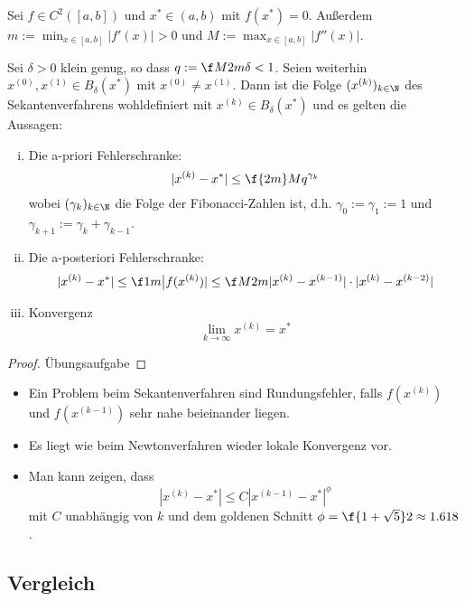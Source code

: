 \documentclass[11pt]{scrbook}
\begin{document}
\begin{st} \label{3.6}
	Sei $f\in C^2([a,b])$ und $x^* \in (a,b)$ mit $f(x^*) = 0$.
	Außerdem $m := \min_{x \in [a,b]}|f'(x)| > 0$ und $M := \max_{x\in[a,b]}|f''(x)|$.

	Sei $\delta > 0$ klein genug, so dass $q := \f M{2m} \delta < 1$.
	Seien weiterhin $x^{(0)}, x^{(1)} \in B_\delta(x^*)$ mit $x^{(0)} \neq x^{(1)}$.
	Dann ist die Folge $(x^{(k)})_{k \in \N}$ des Sekantenverfahrens wohldefiniert mit $x^{(k)} \in B_\delta(x^*)$ und es gelten die Aussagen:
	\begin{enumerate}[i)]
		\item
			Die a-priori Fehlerschranke:
			\[
				|x^{(k)} -x^*| \le \f {2m}M q^{\gamma_k}
			\]
			wobei $(\gamma_k)_{k\in \N}$ die Folge der Fibonacci-Zahlen ist, d.h. $\gamma_0 := \gamma_1 := 1$ und $\gamma_{k+1} := \gamma_k + \gamma_{k-1}$.
		\item
			Die a-posteriori Fehlerschranke:
			\[
				|x^{(k)}-x^*| \le \f 1m \big| f(x^{(k)}) | \le \f M{2m} |x^{(k)} - x^{(k-1)}| \cdot |x^{(k)}-x^{(k-2)}|
			\]
		\item
			Konvergenz
			\[
				\lim_{k \to \infty} x^{(k)} = x^*
			\]
	\end{enumerate}
	\begin{proof}
		Übungsaufgabe
	\end{proof}
	\begin{note}
		\begin{itemize}
			\item
				Ein Problem beim Sekantenverfahren sind Rundungsfehler, falls $f(x^{(k)})$ und $f(x^{(k-1)})$ sehr nahe beieinander liegen.
			\item
				Es liegt wie beim Newtonverfahren wieder lokale Konvergenz vor.
			\item
				Man kann zeigen, dass
				\[
					|x^{(k)} - x^*| \le C |x^{(k-1)} - x^*|^\phi
				\]
				mit $C$ unabhängig von $k$ und dem goldenen Schnitt $\phi = \f {1+\sqrt 5}2 \approx 1.618$.
		\end{itemize}
	\end{note}
\end{st}

\subsection{Vergleich}
\end{document}
